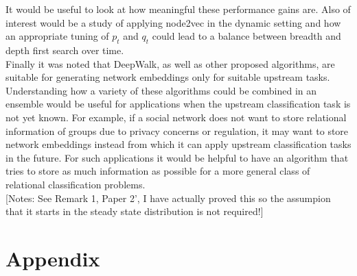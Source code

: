 \documentclass[a4paper]{article}
\begin{document}
It would be useful to look at how meaningful these performance gains are. Also of interest would be a study of applying node2vec in the dynamic setting and how an appropriate tuning of $p_t$ and $q_t$ could lead to a balance between breadth and depth first search over time.\\
Finally it was noted that DeepWalk, as well as other proposed algorithms, are suitable for generating network embeddings only for suitable upstream tasks. Understanding how a variety of these algorithms could be combined in an ensemble would be useful for applications when the upstream classification task is not yet known. For example, if a social network
does not want to store relational information of groups due to privacy concerns or regulation, it may want to store network embeddings instead from which it can apply upstream classification tasks in the future. For such applications it would be helpful to have an algorithm that tries to store as much information as possible for a more general class of relational classification problems.\\

[Notes: See Remark 1, Paper 2', I have actually proved this so the assumpion that it starts in the steady state distribution is not required!]
\section{Appendix}
\label{sec:appendix}
\end{document}
